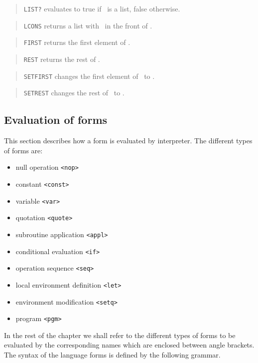 \begin{quote}
	{\tt LIST?} evaluates to true if \obj\ is a list, false otherwise.
\end{quote}

\begin{quote}
	{\tt LCONS} returns a list with \obj\ in the front of \LIST.
\end{quote}

\begin{quote}
	{\tt FIRST} returns the first element of \LIST.
\end{quote}

\begin{quote}
	{\tt REST} returns the rest of \LIST.
\end{quote}

\begin{quote}
	{\tt SETFIRST} changes the first element of \LIST\ to \obj.
\end{quote}

\begin{quote}
	{\tt SETREST} changes the rest of \LISTone\ to \LISTtwo.
\end{quote}


\subsection{Evaluation of forms}

This section describes how a form is evaluated by {\HG} interpreter.
The different types of forms are:

\begin{itemize}
	\item null operation {\tt <nop>}
	\item constant {\tt <const>}
	\item variable {\tt <var>}
	\item quotation {\tt <quote>}
	\item subroutine application {\tt <appl>}
	\item conditional evaluation {\tt <if>}
	\item operation sequence {\tt <seq>}
	\item local environment definition {\tt <let>}
	\item environment modification {\tt <setq>}
	\item program {\tt <pgm>}
\end{itemize}
%
In the rest of the chapter we shall refer to the different types of forms to be
evaluated by the corresponding names which are enclosed between angle brackets.
The syntax of the language forms is defined by the following grammar.

